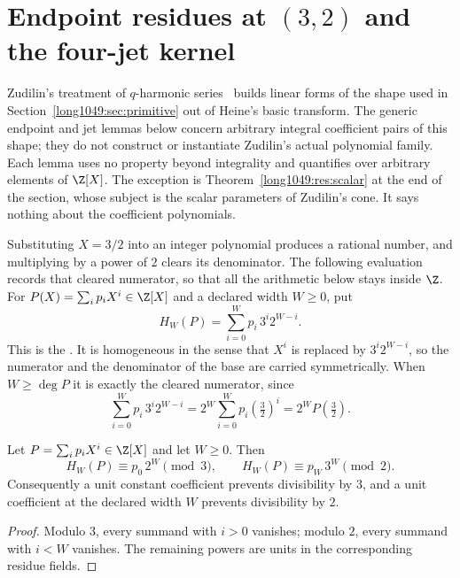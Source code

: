 \documentclass[11pt]{article}
\begin{document}
\section{Endpoint residues at $(3,2)$ and the four-jet
kernel}\label{long1049:sec:endpoints}

Zudilin's treatment of \(q\)-harmonic series~\cite{zudilin2004} builds linear
forms of the shape used in Section~\ref{long1049:sec:primitive} out of Heine's basic
transform.  The generic endpoint and jet lemmas below concern arbitrary
integral coefficient pairs of this shape; they do not construct or instantiate
Zudilin's actual polynomial family.  Each lemma uses no property beyond
integrality and quantifies over arbitrary elements of \(\Z[X]\).  The exception is
Theorem~\ref{long1049:res:scalar} at the end of the section, whose subject is the scalar
parameters of Zudilin's cone.  It says nothing about the coefficient
polynomials.

Substituting \(X=3/2\) into an integer polynomial produces a rational number,
and multiplying by a power of \(2\) clears its denominator.  The following
evaluation records that cleared numerator, so that all the arithmetic below
stays inside \(\Z\).  For \(P(X)=\sum_i p_iX^i\in\Z[X]\) and a declared width
\(W\ge0\), put
\[
 H_W(P)=\sum_{i=0}^{W}p_i\,3^i2^{W-i}.
\]
This is the
.  It is homogeneous in the sense that \(X^{i}\) is
replaced by \(3^{i}2^{W-i}\), so the numerator and the denominator of the base
are carried symmetrically.  When \(W\ge\deg P\) it is exactly the cleared
numerator, since
\[
 \sum_{i=0}^{W}p_i\,3^i2^{W-i}=2^{W}\sum_{i=0}^{W}p_i\left(\tfrac32\right)^{i}
 =2^{W}P\!\left(\tfrac32\right).
\]

\begin{theorem}\label{long1049:res:endpoints}
Let \(P=\sum_ip_iX^i\in\Z[X]\) and let \(W\ge0\).  Then
\[
 H_W(P)\equiv p_0\,2^W\pmod 3,\qquad
 H_W(P)\equiv p_W\,3^W\pmod 2.
\]
Consequently a unit constant coefficient prevents divisibility by \(3\), and
a unit coefficient at the declared width \(W\) prevents divisibility by \(2\).
\end{theorem}

\begin{proof}
Modulo \(3\), every summand with \(i>0\) vanishes; modulo \(2\), every summand
with \(i<W\) vanishes.  The remaining powers are units in the corresponding
residue fields.
\end{proof}
\end{document}

